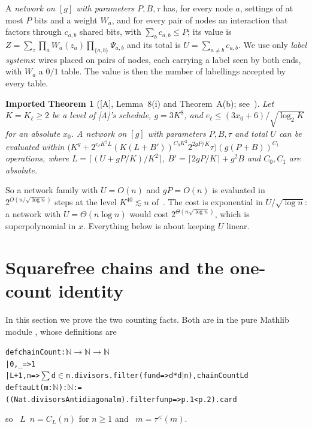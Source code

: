 \documentclass[10pt]{amsart}
\theoremstyle{plain}
\newtheorem{importedtheorem}[theorem]{Imported Theorem}
\theoremstyle{definition}
\theoremstyle{remark}
\numberwithin{equation}{section}
\newcommand{\A}{\textup{[A]}}
\newcommand{\tl}{\tau^{<}}
\newcommand{\rate}{2^{O(n/\sqrt{\log n})}}
\begin{document}
A \emph{network on $[g]$ with parameters $P,B,\tau$} has, for every node $a$, settings of at most $P$
bits and a weight $W_a$, and for every pair of nodes an interaction that factors through $c_{a,b}$
shared bits, with $\sum_bc_{a,b}\le P$; its value is $Z=\sum_z\prod_aW_a(z_a)\prod_{\{a,b\}}\Psi_{a,b}$ and
its total is $U=\sum_{a\ne b}c_{a,b}$. We use only \emph{label systems}: wires placed on pairs of
nodes, each carrying a label seen by both ends, with $W_a$ a $0/1$ table. The value is then the
number of labellings accepted by every table.

\begin{importedtheorem}[\A, Lemma~8(i) and Theorem~A(b); see~{\cite[Imported Thm.~2.2]{TulFac26}}]\label{imp:engine}
Let $K=K_\ell\ge2$ be a level of \A's schedule, $g=3K^8$, and $e_\ell\le(3x_0+6)/\sqrt{\log_2K}$ for an
absolute $x_0$. A network on $[g]$ with parameters $P,B,\tau$ and total $U$ can be evaluated within
$\bigl(K^g+2^{e_\ell K^2L}(K(L+B'))^{C_0K^2}2^{2gP/K}\tau\bigr)(g(P+B))^{C_1}$ operations, where
$L=\lceil(U+gP/K)/K^2\rceil$, $B'=\lceil2gP/K\rceil+g^2B$ and $C_0,C_1$ are absolute.
\end{importedtheorem}

\noindent So a network family with $U=O(n)$ and $gP=O(n)$ is evaluated in $\rate$ steps at the level
$K^{40}\lesssim n$ of~\cite[\S5]{TulFac26}. The cost is exponential in $U/\sqrt{\log n}$: a
network with $U=\Theta(n\log n)$ would cost $2^{\Theta(n\sqrt{\log n})}$, which is superpolynomial in $x$.
Everything below is about keeping $U$ linear.

\section{Squarefree chains and the one-count identity}\label{sec:chains}

In this section we prove the two counting facts. Both are in the pure Mathlib module
, whose definitions are
\begin{alltt}\footnotesize
def chainCount : \(\mathbb{N}\) \(\to\) \(\mathbb{N}\) \(\to\) \(\mathbb{N}\)
  | 0, _ => 1
  | L+1, n => \(\sum\) d \(\in\) n.divisors.filter (fun d => d * d \(\mid\) n), chainCount L d
def tauLt (m : \(\mathbb{N}\)) : \(\mathbb{N}\) := ((Nat.divisorsAntidiagonal m).filter fun p => p.1 < p.2).card
\end{alltt}
so ~$L$~$n=C_L(n)$ for $n\ge1$ and ~$m=\tl(m)$.
\end{document}
